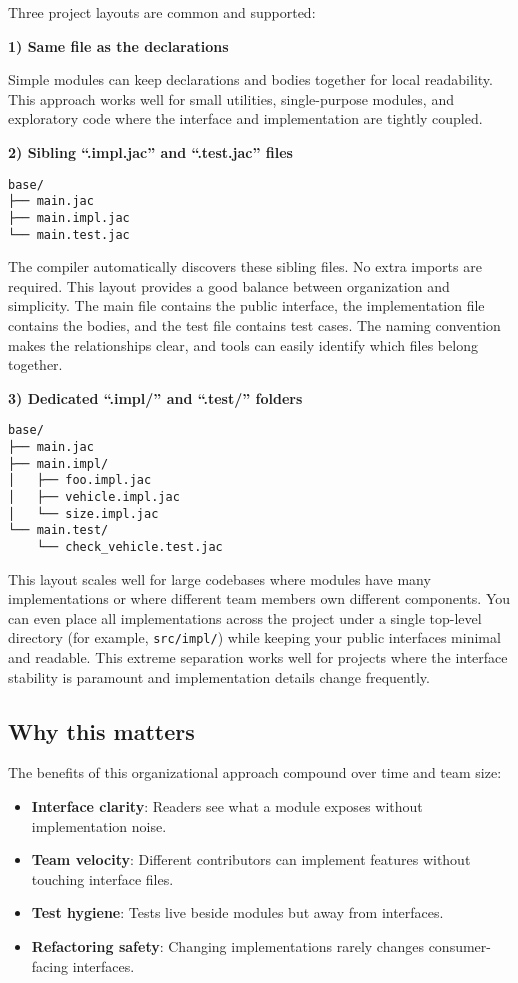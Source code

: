 Three project layouts are common and supported:

\textbf{1) Same file as the declarations}

Simple modules can keep declarations and bodies together for local readability. This approach works well for small utilities, single-purpose modules, and exploratory code where the interface and implementation are tightly coupled.

\textbf{2) Sibling ``.impl.jac'' and ``.test.jac'' files}

\begin{lstlisting}[language=shell]
base/
├── main.jac
├── main.impl.jac
└── main.test.jac
\end{lstlisting}

The compiler automatically discovers these sibling files. No extra imports are required. This layout provides a good balance between organization and simplicity. The main file contains the public interface, the implementation file contains the bodies, and the test file contains test cases. The naming convention makes the relationships clear, and tools can easily identify which files belong together.

\textbf{3) Dedicated ``.impl/'' and ``.test/'' folders}

\begin{lstlisting}[language=shell]
base/
├── main.jac
├── main.impl/
│   ├── foo.impl.jac
│   ├── vehicle.impl.jac
│   └── size.impl.jac
└── main.test/
    └── check_vehicle.test.jac
\end{lstlisting}

This layout scales well for large codebases where modules have many implementations or where different team members own different components. You can even place all implementations across the project under a single top-level directory (for example, \texttt{src/impl/}) while keeping your public interfaces minimal and readable. This extreme separation works well for projects where the interface stability is paramount and implementation details change frequently.

\subsection*{Why this matters}

The benefits of this organizational approach compound over time and team size:

\begin{itemize}
    \item \textbf{Interface clarity}: Readers see what a module exposes without implementation noise.
    \item \textbf{Team velocity}: Different contributors can implement features without touching interface files.
    \item \textbf{Test hygiene}: Tests live beside modules but away from interfaces.
    \item \textbf{Refactoring safety}: Changing implementations rarely changes consumer-facing interfaces.
\end{itemize}

